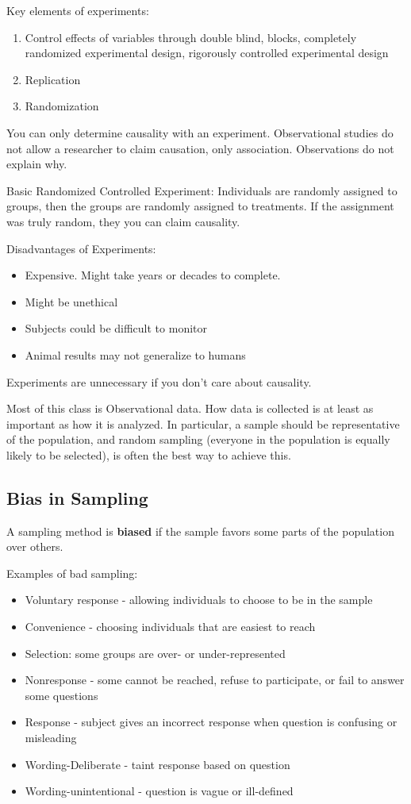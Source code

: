 \documentclass[11pt, oneside]{article}   	%
\begin{document}
Key elements of experiments:
\begin{enumerate}
\item{Control effects of variables through double blind, blocks, completely randomized experimental design, rigorously controlled experimental design}
\item{Replication}
\item{Randomization}
\end{enumerate}

You can only determine causality with an experiment. Observational studies do not allow a researcher to
claim causation, only association. Observations do not explain why.

Basic Randomized Controlled Experiment: Individuals are randomly assigned to groups, then the groups are randomly assigned to treatments. If the assignment was truly random, they you can claim causality. 

Disadvantages of Experiments:
\begin{itemize}
\item{Expensive. Might take years or decades to complete.}
\item{Might be unethical}
\item{Subjects could be difficult to monitor}
\item{Animal results may not generalize to humans}
\end{itemize}

Experiments are unnecessary if you don't care about causality.

Most of this class is Observational data. How data is collected is at least as important as how it is analyzed. In particular, a sample should be representative of the population, and random sampling (everyone in the population is equally likely to be selected), is often the best way to achieve this.

\subsection{Bias in Sampling}

A sampling method is \textbf{biased} if the sample favors some parts of the population over others.

Examples of bad sampling:
\begin{itemize}
\item{Voluntary response - allowing individuals to choose to be in the sample}
\item{Convenience - choosing individuals that are easiest to reach}
\item{Selection: some groups are over- or under-represented}
\item{Nonresponse - some cannot be reached, refuse to participate, or fail to answer some questions}
\item{Response - subject gives an incorrect response when question is confusing or misleading}
\item{Wording-Deliberate - taint response based on question}
\item{Wording-unintentional - question is vague or ill-defined}
\end{itemize}
\end{document}
